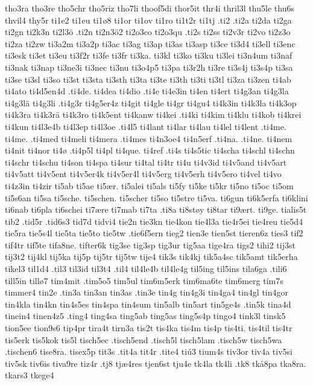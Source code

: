 {{tho3ra
tho3re
tho5chr
tho5riz
tho7li
thoof5di
thor5it
thr4i
thril3l
thu5le
thu6s
thvil4
thy5r
ti1e2
ti1eu
ti1ø8
ti1or
ti1ov
ti1ro
ti1t2r
ti1tj
.ti2
.ti2a
ti2da
ti2ga
ti2gn
ti2k3n
ti2l3ö
.ti2n
ti2n3ö2
ti2o3co
ti2o3qu
.ti2s
ti2ss
ti2v3r
ti2vo
ti2z3o
ti2za
ti2zw
ti3a2m
ti3a2p
ti3ac
ti3ag
ti3ap
ti3as
ti3asp
ti3ce
ti3d4
ti3ell
ti3enc
ti3esk
ti3et
ti3eu
ti3f2r
ti3fe
ti3fr
ti3ka.
ti3kl
ti3ko
ti3ku
ti3lei
ti3n4um
ti3naf
ti3nak
ti3nap
ti3ne3i
ti3nec
ti3nu
ti3o4p5
ti3pa
ti3r2h
ti3re
ti3s4j
ti3s4p
ti3sa
ti3se
ti3sl
ti3so
ti3st
ti3sta
ti3sth
ti3ta
ti3te
ti3th
ti3ti
ti3tl
ti3za
ti3zen
ti4ab
ti4ato
ti4d5en4d
.ti4de.
ti4dea
ti4dio
.ti4e
ti4e3in
ti4en
ti4ert
ti4g3an
ti4g3la
ti4g3lä
ti4g3li
.ti4g3r
ti4g5er4z
ti4git
ti4gle
ti4gr
ti4gu4
ti4k3in
ti4k3la
ti4k3op
ti4k3ra
ti4k3rä
ti4k3ro
ti4k5ent
ti4kanw
ti4kei
.ti4ki
ti4kim
ti4klu
ti4kob
ti4krei
ti4kun
ti4l3e4b
ti4l3ep
ti4l3oe
.ti4l5
ti4lant
ti4lar
ti4lau
ti4lel
ti4lent
.ti4me.
ti4me.
.ti4med
ti4meli
ti4mera
.ti4mes
ti4n3oe4
ti4n5erf
.ti4na.
.ti4ne.
ti4nem
ti4nit
ti4nor
ti4ø
.ti4p5l
ti4pl
ti4que.
ti4ref
.ti4s
ti4s5tic
ti4scha
ti4schl
ti4schn
ti4schr
ti4schu
ti4son
ti4spa
ti4sur
ti4tal
ti4tr
ti4u
ti4v3id
ti4v5and
ti4v5art
ti4v5att
ti4v5ent
ti4v5er4k
ti4v5er4l
ti4v5erg
ti4v5erh
ti4v5ero
ti4vel
ti4vo
ti4z3in
ti4zir
ti5ab
ti5ae
ti5ær.
ti5alei
ti5als
ti5fy
ti5ke
ti5kr
ti5no
ti5oc
ti5om
ti5s6an
ti5sa
ti5sche.
ti5schen.
ti5scher
ti5so
ti5stre
ti5va.
ti6gun
ti6k5erfa
ti6klini
ti6nab
ti6pla
ti6schei
ti7ære
ti7mab
ti7ta
.ti8a
ti8støy
ti8tar
ti9ært.
ti9ge.
tialis5t
tib2
.tid5r
.tid6s3
tid7d
tidvi4
tie2n
tie3kn
tie4kon
tie4l3a
tie4r5ei
tie4reu
tie5d4
tie5ra
tie5s4l
tie5ta
tie5to
tie5tw
.tie6f5ern
tieg2
tien3e
tien5st
tieren6z
ties3
tif2
tif4tr
tif5te
tifa8ne.
tifter6k
tig3se
tig3sp
tig3ur
tig5aa
tige4ra
tigs2
tihi2
tij3st
tij3t2
tij4kl
tij5ka
tij5p
tij5tr
tij5tw
tije4
tik3s
tik4kj
tik5a4sc
tik5amt
tik5erha
tikel3
til1d4
.til3
til3id
til3t4
.til4
til4le4b
til4le4g
til5ing
til5ins
tila6ga
.tili6
till5in
tillø7
tim4mit
.tim5o5
tim5ul
tim6m5erk
tim6ma6te
tim6merg
tim7s
timmer4
tin2e
.tin3a
tin3an
tin3as
.tin3e
tin4g
tin4g3i
tin4ga4
tin4gl
tin4gor
tin4kla
tin4kn
tin4s5es
tin4spa
tin4sum
tin5alb
tin5art
tin5ge4s
.tin5k
tina4d
tinein4
tinen4z5
.ting4
ting4sa
ting5ab
ting5as
ting5s4p
tingo4
tink3l
tinsk5
tion5ee
tion9s6
tip4pr
tira4t
tirn3a
tis2t
tis4ka
tis4m
tis4p
tis4ti.
tis4til
tis4tr
tis5erk
tis5kok
tis5l
tisch5ec
.tisch5end
.tisch5l
tisch5lam
.tisch5w
tisch5wa
.tischen6
tise8ra.
tisex5p
tit3s
.tit4a
tit4r
.tite4
tiú3
tium4s
tiv3or
tiv4a
tiv5si
tiv5sk
tiv6is
tiva9re
tiz4r
.tj8
tjæ4res
tjen6st
tju4e
tk4la
tk4li
.tk8
tkå8pa
tka8ra.
tkars3
tkege4
}}
